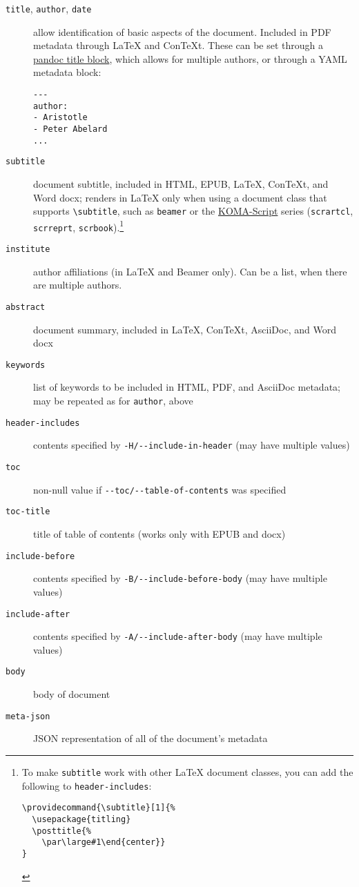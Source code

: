 \documentclass[]{article}
\begin{document}
\begin{description}
\item[\texttt{title}, \texttt{author}, \texttt{date}]
allow identification of basic aspects of the document. Included in PDF
metadata through LaTeX and ConTeXt. These can be set through a
\protect\hyperlink{extension-pandoc_title_block}{pandoc title block},
which allows for multiple authors, or through a YAML metadata block:

\begin{verbatim}
---
author:
- Aristotle
- Peter Abelard
...
\end{verbatim}
\item[\texttt{subtitle}]
document subtitle, included in HTML, EPUB, LaTeX, ConTeXt, and Word
docx; renders in LaTeX only when using a document class that supports
\texttt{\textbackslash{}subtitle}, such as \texttt{beamer} or the
\href{https://ctan.org/pkg/koma-script}{KOMA-Script} series
(\texttt{scrartcl}, \texttt{scrreprt}, \texttt{scrbook}).\footnote{To
  make \texttt{subtitle} work with other LaTeX document classes, you can
  add the following to \texttt{header-includes}:

\begin{Verbatim}
\providecommand{\subtitle}[1]{%
  \usepackage{titling}
  \posttitle{%
    \par\large#1\end{center}}
}
\end{Verbatim}
}
\item[\texttt{institute}]
author affiliations (in LaTeX and Beamer only). Can be a list, when
there are multiple authors.
\item[\texttt{abstract}]
document summary, included in LaTeX, ConTeXt, AsciiDoc, and Word docx
\item[\texttt{keywords}]
list of keywords to be included in HTML, PDF, and AsciiDoc metadata; may
be repeated as for \texttt{author}, above
\item[\texttt{header-includes}]
contents specified by \texttt{-H/-\/-include-in-header} (may have
multiple values)
\item[\texttt{toc}]
non-null value if \texttt{-\/-toc/-\/-table-of-contents} was specified
\item[\texttt{toc-title}]
title of table of contents (works only with EPUB and docx)
\item[\texttt{include-before}]
contents specified by \texttt{-B/-\/-include-before-body} (may have
multiple values)
\item[\texttt{include-after}]
contents specified by \texttt{-A/-\/-include-after-body} (may have
multiple values)
\item[\texttt{body}]
body of document
\item[\texttt{meta-json}]
JSON representation of all of the document's metadata
\end{description}
\end{document}
